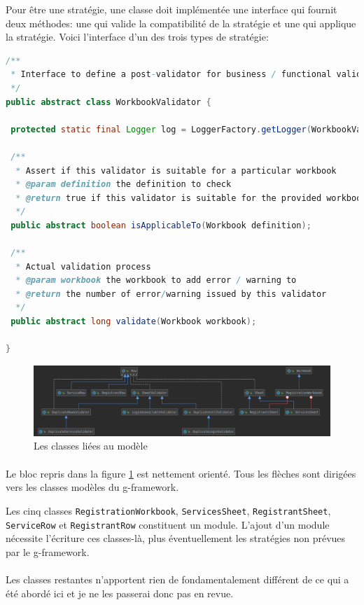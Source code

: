 Pour être une stratégie, une classe doit implémentée une interface qui fournit deux méthodes: une qui valide la compatibilité de la stratégie et une qui applique la stratégie.
Voici l'interface d'un des trois types de stratégie:
\begin{lstlisting}[language=Java]
/**
 * Interface to define a post-validator for business / functional validation in the whole workbook
 */
public abstract class WorkbookValidator {

 protected static final Logger log = LoggerFactory.getLogger(WorkbookValidator.class);
 
 /**
  * Assert if this validator is suitable for a particular workbook
  * @param definition the definition to check
  * @return true if this validator is suitable for the provided workbook
  */
 public abstract boolean isApplicableTo(Workbook definition);
 
 /**
  * Actual validation process
  * @param workbook the workbook to add error / warning to
  * @return the number of error/warning issued by this validator
  */
 public abstract long validate(Workbook workbook);

}
\end{lstlisting}

\begin{figure}[ht]
    \centering
    \includegraphics[width=1\textwidth]{images/diagrams/row-dependencies.png}
    \caption{Les classes liées au modèle}
    \label{fig:class-model}
\end{figure}
\paragraph{}
Le bloc repris dans la figure \ref{fig:class-model} est nettement orienté.
Tous les flèches sont dirigées vers les classes modèles du \gls{g-framework}.

Les cinq classes \lstinline{RegistrationWorkbook}, \lstinline{ServicesSheet}, \lstinline{RegistrantSheet}, \lstinline{ServiceRow} et \lstinline{RegistrantRow} constituent un module.
L'ajout d'un module nécessite l'écriture ces classes-là, plus éventuellement les stratégies non prévues par le \gls{g-framework}.

\paragraph{}
Les classes restantes n'apportent rien de fondamentalement différent de ce qui a été abordé ici et je ne les passerai donc pas en revue.

